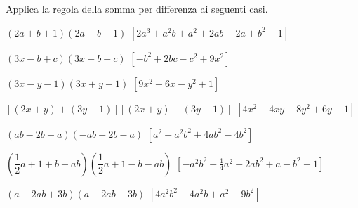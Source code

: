
\begin{esercizio}[\Ast]
 \label{ese:11.21}
Applica la regola della somma per differenza ai seguenti casi.

\begin{enumeratea}
\item \((2a+b+1)(2a+b-1)\) \hfill 
\(\left[2 a^{3} + a^{2} b + a^{2} + 2 a b - 2 a + b^{2} - 1 \right]\)
\item \((3x-b+c)(3x+b-c)\) \hfill 
\(\left[- b^{2} + 2 b c - c^{2} + 9 x^{2} \right]\)
\item \((3x-y-1)(3x+y-1)\)
  \hfill \(\left[9x^{2}-6x-y^{2}+1\right]\)
\item \(\left[(2x+y)+(3y-1)\right]\left[(2x+y)-(3y-1)\right]\) \hfill 
\(\left[4 x^{2} + 4 x y - 8 y^{2} + 6 y - 1 \right]\)
\item \((ab-2b-a)(-{ab}+2b-a)\)
  \hfill \(\left[a^{2}-a^{2}b^{2}+4{ab}^{2}-4b^{2}\right]\)
\item \(\left(\dfrac{1}{2}a+1+b+ab\right)\left(\dfrac{1}{2}a+1-b-ab\right)\)
  \hfill \(\left[-a^{2}b^{2}+\frac{1}{4}a^{2}-2{ab}^{2}+a-b^{2}+1\right]\)
\item \(\left(a-2ab+3b\right)\left(a-2ab-3b\right)\)
  \hfill \(\left[4 a^{2} b^{2} - 4 a^{2} b + a^{2} - 9 b^{2} \right]\)
\end{enumeratea}
\end{esercizio}

